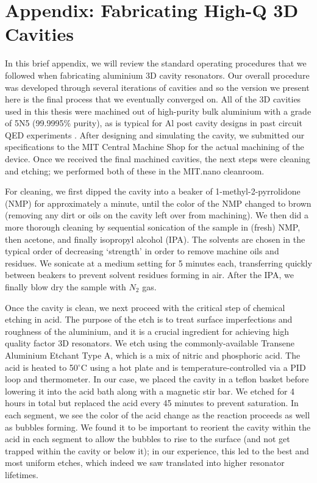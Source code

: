 \chapter{Appendix: Fabricating High-Q 3D Cavities \label{ch:AppB}}

In this brief appendix, we will review the standard operating procedures that we followed when fabricating aluminium 3D cavity resonators. Our overall procedure was developed through several iterations of cavities and so the version we present here is the final process that we eventually converged on. All of the 3D cavities used in this thesis were machined out of high-purity bulk aluminium with a grade of 5N5 (99.9995\% purity), as is typical for Al post cavity designs in past circuit QED experiments \cite{reagor2013reaching}. After designing and simulating the cavity, we submitted our specifications to the MIT Central Machine Shop for the actual machining of the device. Once we received the final machined cavities, the next steps were cleaning and etching; we performed both of these in the MIT.nano cleanroom.

For cleaning, we first dipped the cavity into a beaker of 1-methyl-2-pyrrolidone (NMP) for approximately a minute, until the color of the NMP changed to brown (removing any dirt or oils on the cavity left over from machining). We then did a more thorough cleaning by sequential sonication of the sample in (fresh) NMP, then acetone, and finally isopropyl alcohol (IPA). The solvents are chosen in the typical order of decreasing `strength' in order to remove machine oils and residues. We sonicate at a medium setting for 5 minutes each, transferring quickly between beakers to prevent solvent residues forming in air. After the IPA, we finally blow dry the sample with $N_2$ gas. 

Once the cavity is clean, we next proceed with the critical step of chemical etching in acid. The purpose of the etch is to treat surface imperfections and roughness of the aluminium, and it is a crucial ingredient for achieving high quality factor 3D resonators. We etch using the commonly-available Transene Aluminium Etchant Type A, which is a mix of nitric and phosphoric acid. The acid is heated to 50$^\circ$C using a hot plate and is temperature-controlled via a PID loop and thermometer. In our case, we placed the cavity in a teflon basket before lowering it into the acid bath along with a magnetic stir bar. We etched for 4 hours in total but replaced the acid every 45 minutes to prevent saturation. In each segment, we see the color of the acid change as the reaction proceeds as well as bubbles forming. We found it to be important to reorient the cavity within the acid in each segment to allow the bubbles to rise to the surface (and not get trapped within the cavity or below it); in our experience, this led to the best and most uniform etches, which indeed we saw translated into higher resonator lifetimes. 

